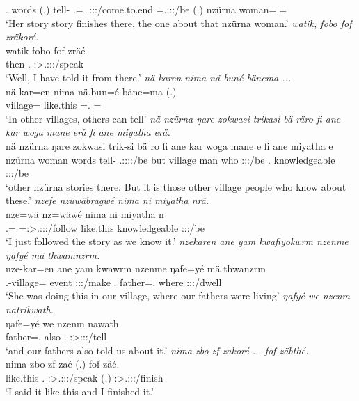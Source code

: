 \begin{exe}
	\Tsg.{\Poss} words (.) {\Dem} tell-{\Nmlz} \Dist.\All={\Only} \Tsg.\F:\Sbj:\Nonpast:\Ipfv/come.to.end {\Emph} \Med=\Tsg.\F:\Sbj:\Nonpast:\Ipfv/be (.) {\Dem} nzürna woman=\Poss.\Sg={\Char}\\
	\trans `Her story story finishes there, the one about that nzürna woman.'
	\emph{watik, fobo fof zräkoré.}\\
	\gll watik fobo fof zräé\\
	then \Dist.{\All} {\Emph} \Fsg:\Sbj>\Tsg.\F:\Obj:\Irr:\Pfv/speak\\
	\trans `Well, I have told it from there.'
	\emph{nä karen nima nä buné bänema ...}\\
	\gll nä kar=en nima {nä.bun=é} bäne=ma (.)\\
	{\Indf} village={\Loc} like.this \Indf=\Erg.{\Nsg} \Recog={\Char}\\
	\trans `In other villages, others can tell'
	\emph{nä nzürna ŋare zokwasi trikasi bä räro fi ane kar woga mane erä fi ane miyatha erä.}\\
	\gll nä nzürna ŋare zokwasi trik-si bä ro fi ane kar woga mane e fi ane miyatha e\\
	{\Indf} nzürna woman words tell-{\Nmlz} \Med{} \Tsg.\F:\Sbj:\Nonpast:\Ipfv:\Andat/be but {\Dem} village man who \Stpl:\Sbj:\Nonpast:\Ipfv/be \Third.{\Abs} {\Dem} knowledgeable \Stpl:\Sbj:\Nonpast:\Ipfv/be\\
	\trans `other nzürna stories there. But it is those other village people who know about these.'
	\emph{nzefe nzüwäbragwé nima ni miyatha nrä.}\\
	\gll nze=wä nz=wäwé nima ni miyatha n\\
	\Fsg.\Erg={\Emph} \Immpst=\Fsg:\Sbj>\Tsg.\F:\Obj:\Nonpast:\Ipfv/follow like.this {\Fnsg} knowledgeable \Fpl:\Sbj:\Nonpast:\Ipfv/be\\
	\trans `I just followed the story as we know it.'
	\emph{nzekaren ane yam kwafiyokwrm nzenme ŋafyé mä thwamnzrm.}\\
	\gll nze-kar=en ane yam kwawrm nzenme ŋafe=yé mä thwanzrm\\
	\Fnsg.\Poss-village={\Loc} {\Dem} event \Sg:\Sbj:\Pst:\Dur/make \Fnsg.{\Poss} father=\Abs.{\Nsg} where \Stpl:\Sbj:\Pst:\Dur/dwell\\
	\trans `She was doing this in our village, where our fathers were living'
	\emph{ŋafyé we nzenm natrikwath.}\\
	\gll ŋafe=yé we nzenm nawath\\
	father=\Erg.{\Nsg} also \Fnsg.{\Dat} \Stpl:\Sbj>\Fpl:\Io:\Pst:\Ipfv/tell\\
	\trans `and our fathers also told us about it.'
	\emph{nima zbo zf zakoré ... fof zäbthé.}\\
	\gll nima zbo zf zaé (.) fof zäé.\\
	like.this \Prox.{\All} {\Imm} \Fsg:\Sbj>\Tsg.\F:\Obj:\Rpst:\Pfv/speak (.) {\Emph} \Fsg:\Sbj>\Tsg.\F:\Obj:\Rpst:\Pfv/finish\\
	\trans `I said it like this and I finished it.'	
\end{exe}%